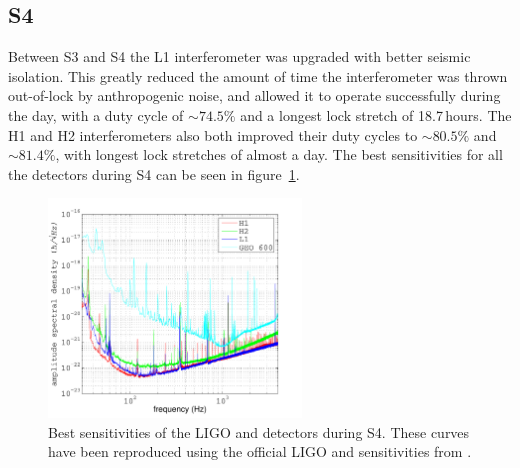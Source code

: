 \subsection{S4}
Between S3 and S4 the L1 interferometer was upgraded with better seismic isolation. This greatly
reduced the amount of time the interferometer was thrown out-of-lock by anthropogenic noise, and
allowed it to operate successfully during the day, with a duty cycle of $\sim 74.5\%$ and a longest
lock stretch of 18.7\,hours. The H1 and H2 interferometers also both improved their duty cycles to
$\sim 80.5\%$ and $\sim 81.4\%$, with longest lock stretches of almost a day. The best
sensitivities for all the detectors during S4 can be seen in figure~\ref{LIGO_GEO_S4_STRAIN}.
\begin{figure}[!htbp]
\begin{center}
\includegraphics[width=0.6\textwidth]{figs/LIGO_GEO_S4_STRAIN}\caption[Best sensitivities of the
LIGO and \geo detectors during S4.]{Best sensitivities of the LIGO and \geo detectors during S4.
These curves have been reproduced using the official LIGO and \geo sensitivities from 
\cite{LIGOsensitivity, GEOsensitivity}.}\label{LIGO_GEO_S4_STRAIN}
\end{center}
\end{figure}

